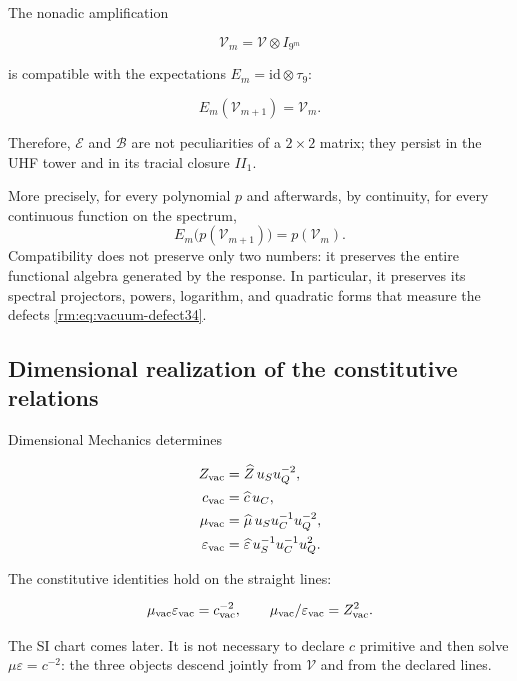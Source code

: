 The nonadic amplification

\[
\mathcal V_m=\mathcal V\otimes I_{9^m}
\]

is compatible with the expectations \(E_m=\mathrm{id}\otimes\tau_9\):

\[
E_m(\mathcal V_{m+1})=\mathcal V_m.
\]

Therefore, \(\mathcal E\) and \(\mathcal B\) are not peculiarities of a \(2\times2\) matrix; they persist in the UHF tower and in its tracial closure \(II_1\).

More precisely, for every polynomial \(p\) and afterwards, by continuity,
for every continuous function on the spectrum,
\begin{equation}
E_m\bigl(p(\mathcal V_{m+1})\bigr)=p(\mathcal V_m).
\label{rm:eq:vacuum-functional-refinement}
\end{equation}
Compatibility does not preserve only two numbers: it preserves the entire
functional algebra generated by the response. In particular, it preserves its
spectral projectors, powers, logarithm, and quadratic forms
that measure the defects \cref{rm:eq:vacuum-defect34}.

\subsection{Dimensional realization of the constitutive relations}

Dimensional Mechanics determines

\begin{align}
Z_{\rm vac}&=\widehat Z\,u_Su_Q^{-2},\\
c_{\rm vac}&=\widehat c\,u_C,\\
\mu_{\rm vac}&=\widehat\mu\,u_Su_C^{-1}u_Q^{-2},\\
\varepsilon_{\rm vac}&=\widehat\varepsilon\,u_S^{-1}u_C^{-1}u_Q^2.
\label{rm:eq:vacuum-sections}
\end{align}

The constitutive identities hold on the straight lines:

\begin{equation}
\mu_{\rm vac}\varepsilon_{\rm vac}=c_{\rm vac}^{-2},
\qquad
\mu_{\rm vac}/\varepsilon_{\rm vac}=Z_{\rm vac}^2.
\end{equation}

The SI chart comes later. It is not necessary to declare \(c\) primitive and then solve \(\mu\varepsilon=c^{-2}\): the three objects descend jointly from \(\mathcal V\) and from the declared lines.


